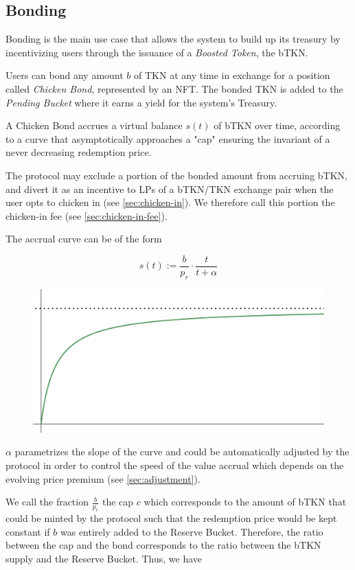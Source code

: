 \documentclass{article}
\begin{document}
\subsection{Bonding}
Bonding is the main use case that allows the system to build up its treasury by incentivizing users through the issuance of a  \textit{Boosted Token}, the bTKN. 

Users can bond any amount $b$ of TKN at any time in exchange for a position called \textit{Chicken Bond}, represented by an NFT. The bonded TKN is added to the \textit{Pending Bucket} where it earns a yield for the system's Treasury.

A Chicken Bond accrues a virtual balance $s(t)$ of bTKN over time, according to a curve that asymptotically approaches a "cap" ensuring the invariant of a never decreasing redemption price. 

The protocol may exclude a portion of the bonded amount from accruing bTKN, and divert it as an incentive to LPs of a bTKN/TKN exchange pair when the user opts to chicken in (see \ref{sec:chicken-in}). We therefore call this portion the chicken-in fee (see \ref{sec:chicken-in-fee}).

The accrual curve can be of the form 

\begin{equation}
  \label{eq:accrual}
    s(t) := \frac{b}{p_r} \cdot \frac{t}{t+\alpha}
\end{equation}

\begin{figure}[ht]
    \centering
    \includegraphics[width=0.5\linewidth]{./ChickenBonds_Whitepaper_accrualcurve.png}
\end{figure}

$\alpha$ parametrizes the slope of the curve and could be automatically adjusted by the protocol in order to control the speed of the value accrual which depends on the evolving price premium (see \ref{sec:adjustment}).

We call the fraction $\frac{b}{p_r}$ the cap $c$ which corresponds to the amount of bTKN that could be minted by the protocol such that the redemption price would be kept constant if $b$ was entirely added to the Reserve Bucket. Therefore, the ratio between the cap and the bond corresponds to the ratio between the bTKN supply and the Reserve Bucket. Thus, we have
\end{document}
